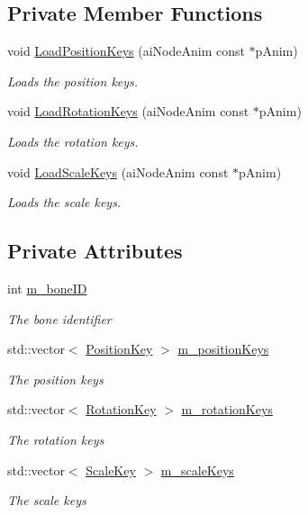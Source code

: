 \subsection*{Private Member Functions}
\begin{DoxyCompactItemize}
\item 
void \hyperlink{class_bone_key_sequence_a9165c4e680ccb15818a1f895e7445332}{Load\+Position\+Keys} (ai\+Node\+Anim const $\ast$p\+Anim)
\begin{DoxyCompactList}\small\item\em Loads the position keys. \end{DoxyCompactList}\item 
void \hyperlink{class_bone_key_sequence_a9eebce05ff9c1a59187f9f8d31fc6f49}{Load\+Rotation\+Keys} (ai\+Node\+Anim const $\ast$p\+Anim)
\begin{DoxyCompactList}\small\item\em Loads the rotation keys. \end{DoxyCompactList}\item 
void \hyperlink{class_bone_key_sequence_af6d9f85bb507d3712d9805b3a5a05421}{Load\+Scale\+Keys} (ai\+Node\+Anim const $\ast$p\+Anim)
\begin{DoxyCompactList}\small\item\em Loads the scale keys. \end{DoxyCompactList}\end{DoxyCompactItemize}
\subsection*{Private Attributes}
\begin{DoxyCompactItemize}
\item 
int \hyperlink{class_bone_key_sequence_a3479ae87f50df83ca145080406a1c3b8}{m\+\_\+bone\+ID}
\begin{DoxyCompactList}\small\item\em The bone identifier \end{DoxyCompactList}\item 
std\+::vector$<$ \hyperlink{struct_position_key}{Position\+Key} $>$ \hyperlink{class_bone_key_sequence_acae9becd7de02c955da5d64050513ce5}{m\+\_\+position\+Keys}
\begin{DoxyCompactList}\small\item\em The position keys \end{DoxyCompactList}\item 
std\+::vector$<$ \hyperlink{struct_rotation_key}{Rotation\+Key} $>$ \hyperlink{class_bone_key_sequence_abb6be9db9c5bdc089b6ae7ea6bdae0e3}{m\+\_\+rotation\+Keys}
\begin{DoxyCompactList}\small\item\em The rotation keys \end{DoxyCompactList}\item 
std\+::vector$<$ \hyperlink{struct_scale_key}{Scale\+Key} $>$ \hyperlink{class_bone_key_sequence_a9a1a5986127adf2f67411d8802463c36}{m\+\_\+scale\+Keys}
\begin{DoxyCompactList}\small\item\em The scale keys \end{DoxyCompactList}\end{DoxyCompactItemize}


